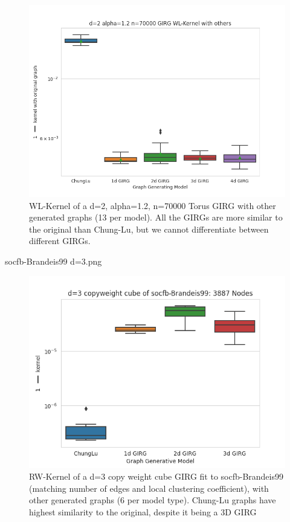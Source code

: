 \begin{figure}
  \centering
\includegraphics[width=0.8\linewidth]{figures/d=2 alpha=1.2 n=70000 GIRG WL-Kernel with others.png}
\caption{WL-Kernel of a d=2, alpha=1.2, n=70000 Torus GIRG with other generated graphs (13 per model). All the GIRGs are more similar to the original than Chung-Lu, but we cannot differentiate between different GIRGs.}
\label{fig:wl_kernel_gentorus}
\end{figure}

socfb-Brandeis99 d=3.png


\begin{figure}
  \centering
\includegraphics[width=0.8\linewidth]{figures/socfb-Brandeis99 d=3.png}
\caption{RW-Kernel of a d=3 copy weight cube GIRG fit to socfb-Brandeis99 (matching number of edges and local clustering coefficient), with other generated graphs (6 per model type). Chung-Lu graphs have highest similarity to the original, despite it being a 3D GIRG}
\label{fig:rw_kernel_fitcopycube}
\end{figure}






